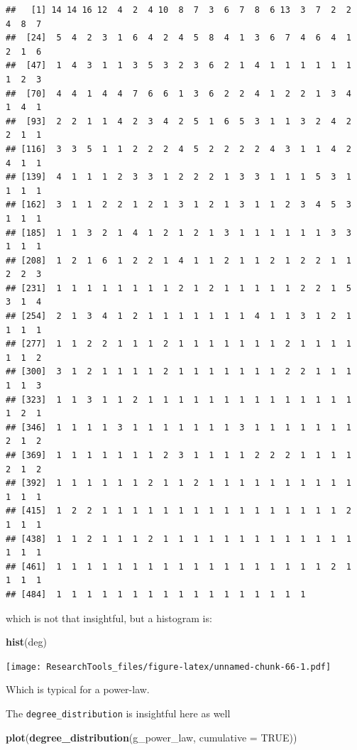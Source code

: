 \documentclass[]{article}
\newenvironment{Shaded}{\begin{snugshade}}{\end{snugshade}}
\newcommand{\KeywordTok}[1]{\textcolor[rgb]{0.13,0.29,0.53}{\textbf{{#1}}}}
\newcommand{\DataTypeTok}[1]{\textcolor[rgb]{0.13,0.29,0.53}{{#1}}}
\newcommand{\OtherTok}[1]{\textcolor[rgb]{0.56,0.35,0.01}{{#1}}}
\newcommand{\NormalTok}[1]{{#1}}
\theoremstyle{definition}
\theoremstyle{definition}
\theoremstyle{definition}
\theoremstyle{remark}
\begin{document}
\begin{verbatim}
##   [1] 14 14 16 12  4  2  4 10  8  7  3  6  7  8  6 13  3  7  2  2  4  8  7
##  [24]  5  4  2  3  1  6  4  2  4  5  8  4  1  3  6  7  4  6  4  1  2  1  6
##  [47]  1  4  3  1  1  3  5  3  2  3  6  2  1  4  1  1  1  1  1  1  1  2  3
##  [70]  4  4  1  4  4  7  6  6  1  3  6  2  2  4  1  2  2  1  3  4  1  4  1
##  [93]  2  2  1  1  4  2  3  4  2  5  1  6  5  3  1  1  3  2  4  2  2  1  1
## [116]  3  3  5  1  1  2  2  2  4  5  2  2  2  2  4  3  1  1  4  2  4  1  1
## [139]  4  1  1  1  2  3  3  1  2  2  2  1  3  3  1  1  1  5  3  1  1  1  1
## [162]  3  1  1  2  2  1  2  1  3  1  2  1  3  1  1  2  3  4  5  3  1  1  1
## [185]  1  1  3  2  1  4  1  2  1  2  1  3  1  1  1  1  1  1  3  3  1  1  1
## [208]  1  2  1  6  1  2  2  1  4  1  1  2  1  1  2  1  2  2  1  1  2  2  3
## [231]  1  1  1  1  1  1  1  1  2  1  2  1  1  1  1  1  2  2  1  5  3  1  4
## [254]  2  1  3  4  1  2  1  1  1  1  1  1  1  4  1  1  3  1  2  1  1  1  1
## [277]  1  1  2  2  1  1  1  2  1  1  1  1  1  1  1  2  1  1  1  1  1  1  2
## [300]  3  1  2  1  1  1  1  2  1  1  1  1  1  1  1  2  2  1  1  1  1  1  3
## [323]  1  1  3  1  1  2  1  1  1  1  1  1  1  1  1  1  1  1  1  1  1  2  1
## [346]  1  1  1  1  3  1  1  1  1  1  1  1  3  1  1  1  1  1  1  1  2  1  2
## [369]  1  1  1  1  1  1  1  2  3  1  1  1  1  2  2  2  1  1  1  1  2  1  2
## [392]  1  1  1  1  1  1  2  1  1  2  1  1  1  1  1  1  1  1  1  1  1  1  1
## [415]  1  2  2  1  1  1  1  1  1  1  1  1  1  1  1  1  1  1  1  2  1  1  1
## [438]  1  1  2  1  1  1  2  1  1  1  1  1  1  1  1  1  1  1  1  1  1  1  1
## [461]  1  1  1  1  1  1  1  1  1  1  1  1  1  1  1  1  1  1  2  1  1  1  1
## [484]  1  1  1  1  1  1  1  1  1  1  1  1  1  1  1  1  1
\end{verbatim}

which is not that insightful, but a histogram is:

\begin{Shaded}
\begin{Highlighting}[]
 \KeywordTok{hist}\NormalTok{(deg)}
\end{Highlighting}
\end{Shaded}

\texttt{[image: ResearchTools\_files/figure-latex/unnamed-chunk-66-1.pdf]}

Which is typical for a power-law.

The \texttt{degree\_distribution} is insightful here as well

\begin{Shaded}
\begin{Highlighting}[]
\KeywordTok{plot}\NormalTok{(}\KeywordTok{degree_distribution}\NormalTok{(g_power_law, }\DataTypeTok{cumulative =} \OtherTok{TRUE}\NormalTok{))}
\end{Highlighting}
\end{Shaded}
\end{document}
